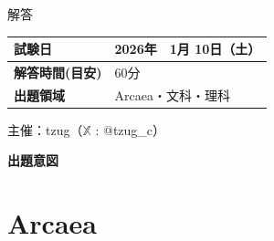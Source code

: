\documentclass[uplatex,dvipdfmx,paper=a4paper,fontsize=11pt,jafontscale=0.9247,lang=ja]{jlreq}
\begin{document}


\thispagestyle{coverpage}
\begin{center}

\vspace*{2cm}

\begin{center}
  \Huge{解答}
\end{center}

\vspace{2cm}

\vspace{3cm}

\renewcommand{\arraystretch}{1.8}
\begin{tabular}{|>{\centering\arraybackslash}p{3.5cm}|>{\centering\arraybackslash}p{7cm}|}
\hline
\textbf{試験日} & 2026年　1月 10日（土） \\
\hline
\textbf{解答時間(目安)} & 60分 \\
\hline
\textbf{出題領域} & Arcaea・文科・理科 \\
\hline
\end{tabular}

\vspace{4cm}

{\large 主催：tzug（$\mathbb{X}$ : @tzug\_c）}

\end{center}
\newpage

\pagestyle{exampage}
\vspace{2em}
\begin{center}
  \LARGE{\textbf{出題意図}}
\end{center}

\section*{Arcaea}
\end{document}
